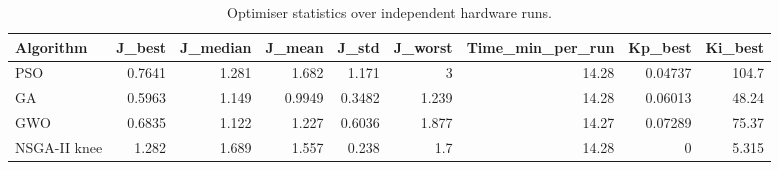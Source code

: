 \begin{table}[t]
\centering\caption{Optimiser statistics over independent hardware runs.}\label{tab:hwstats}
\begin{tabular}{lrrrrrrrr}
\toprule
Algorithm & J\_best & J\_median & J\_mean & J\_std & J\_worst & Time\_min\_per\_run & Kp\_best & Ki\_best \\
\midrule
PSO & 0.7641 & 1.281 & 1.682 & 1.171 & 3 & 14.28 & 0.04737 & 104.7 \\
GA & 0.5963 & 1.149 & 0.9949 & 0.3482 & 1.239 & 14.28 & 0.06013 & 48.24 \\
GWO & 0.6835 & 1.122 & 1.227 & 0.6036 & 1.877 & 14.27 & 0.07289 & 75.37 \\
NSGA-II knee & 1.282 & 1.689 & 1.557 & 0.238 & 1.7 & 14.28 & 0 & 5.315 \\
\bottomrule
\end{tabular}
\end{table}
